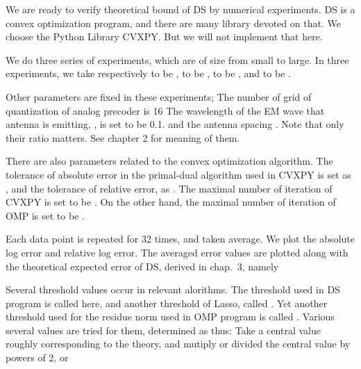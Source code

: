 \startchapter [title={Simulation}]

\startsection [title={Result}]

\startsubsection [title={Settings}]

We are ready to verify theoretical bound of DS by numerical experiments.
DS is a convex optimization program, and there are many library devoted on that.
We choose the Python Library CVXPY.
But we will not implement that here.



We do three series of experiments, which are of size from small to large.
In three experiments, we take respectively  to be ,  to be ,  to be , and  to be .

Other parameters are fixed in these experiments; 
The number of grid of quantization of analog precoder is 16
The wavelength of the EM wave that antenna is emitting, , is set to be 0.1.
and the antenna spacing .
Note that only their ratio matters.
See chapter 2 for meaning of them.

There are also parameters related to the convex optimization algorithm.
The tolerance of absolute error in the primal-dual algorithm used in CVXPY is set as , and the tolerance of relative error, as .
The maximal number of iteration of CVXPY is set to be .
On the other hand, the maximal number of iteration of OMP is set to be .

Each data point is repeated for 32 times, and taken average.
We plot the absolute log error
and relative log error.
The averaged error values are plotted along with the theoretical expected error of DS, derived in chap.\ 3, namely

Several threshold values occur in relevant alorithms.
The threshold used in DS program is called  here, and another threshold of Lasso, called \m {\a}.
Yet another threshold used for the residue norm used in OMP program is called \m {\eta}.
Various several values are tried for them, determined as thus: Take a central value roughly corresponding to the theory, and mutiply or divided the central value by powers of 2, or 

